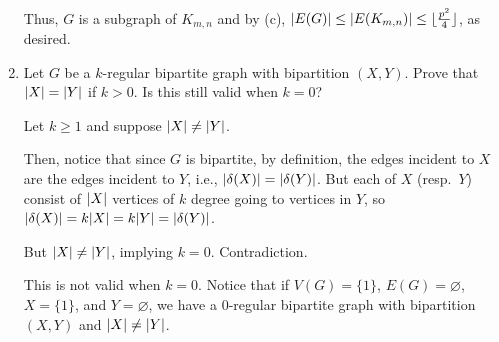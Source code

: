 \documentclass[class=math239,notes,tikz]{agony}
\begin{document}
\begin{enumerate}
\begin{sol}
          Thus, $G$ is a subgraph of $K_{m,n}$
          and by (c), $\abs{E(G)} \leq \abs{E(K_{m,n})} \leq \lfloor\frac{p^2}{4}\rfloor$, as desired.
        \end{sol}
  \item Let $G$ be a $k$-regular bipartite graph with bipartition $(X,Y)$.
        Prove that $\abs{X} = \abs{Y}$ if $k > 0$.
        Is this still valid when $k=0$?
        \begin{prf}
          Let $k \geq 1$ and suppose $\abs{X} \neq \abs{Y}$.

          Then, notice that since $G$ is bipartite, by definition,
          the edges incident to $X$ are the edges incident to $Y$,
          i.e., $\abs{\delta(X)} = \abs{\delta(Y)}$.
          But each of $X$ (resp.\ $Y$) consist of $\abs{X}$
          vertices of $k$ degree going to vertices in $Y$,
          so $\abs{\delta(X)} = k\abs{X} = k\abs{Y} = \abs{\delta(Y)}$.

          But $\abs{X} \neq \abs{Y}$, implying $k = 0$. Contradiction.

          This is not valid when $k=0$.
          Notice that if $V(G) = \{1\}$, $E(G) = \varnothing$,
          $X = \{1\}$, and $Y = \varnothing$,
          we have a 0-regular bipartite graph with bipartition $(X,Y)$
          and $\abs{X} \neq \abs{Y}$.
        \end{prf}
\end{enumerate}
\end{document}
